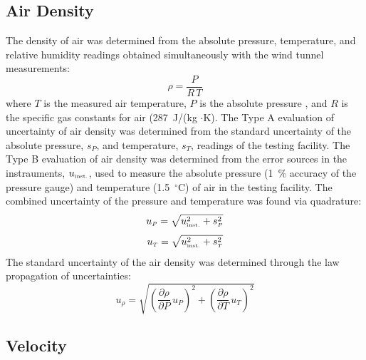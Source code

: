 \documentclass[12pt]{article}
\begin{document}
\subsection{Air Density}
\label{ssec:ADUncertainty}

The density of air was determined from the absolute pressure, temperature, and relative humidity readings obtained simultaneously with the wind tunnel measurements:
\begin{equation}
\rho  =  \frac{P}{R\,T}
\end{equation}
where $T$ is the measured air temperature, $P$ is the absolute pressure , and  $R$ is the specific gas constants for air (287~J/(kg $\cdot$K). The Type A evaluation of uncertainty of air density was determined from the standard uncertainty of the absolute pressure, $s_{\scriptscriptstyle P}$, and temperature, $s_{\scriptscriptstyle T}$, readings of the testing facility. The Type B evaluation of air density was determined from the error sources in the instrauments, $u_{\rm \scriptscriptstyle inst.}$, used to measure the absolute pressure (1~\% accuracy of the pressure gauge) and temperature (1.5~$^\circ$C) of air in the testing facility. The combined uncertainty of the pressure and temperature was found via quadrature:
\begin{equation}
\label{eq:abspressureuncertainty}
u_{\scriptscriptstyle P} = \sqrt{ u_{\rm \scriptscriptstyle inst.}^2 + s_{\scriptscriptstyle P}^2}
\end{equation}
\begin{equation}
\label{eq:tempuncertainty}
u_{\scriptscriptstyle T} = \sqrt{ u_{\rm \scriptscriptstyle inst.}^2 + s_{\scriptscriptstyle T}^2}
\end{equation}
The standard uncertainty of the air density was determined through the law propagation of uncertainties:
\begin{equation}
\label{eq:Densityuncertainty}
u_{\scriptscriptstyle \rho} = \sqrt{{\left( \frac{\partial \rho}{\partial P}\,u_{\scriptscriptstyle P} \right) }^2+{\left(\frac{\partial \rho}{\partial T}\,u_{\scriptscriptstyle T}\right)}^2}
\end{equation}

\subsection{Velocity}
\label{ssec:VelUncertainty}
\end{document}
